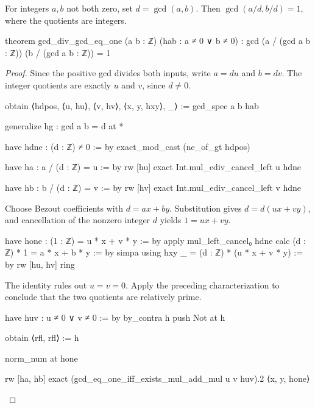 \begin{corollary}
  \label{ent:thm:gcd-div-gcd}
  For integers $a,b$ not both zero, set $d=\gcd(a,b)$.
  Then $\gcd(a/d,b/d)=1$, where the quotients are integers.

  \begin{lean}
    theorem gcd_div_gcd_eq_one (a b : ℤ) (hab : a ≠ 0 ∨ b ≠ 0) :
        gcd (a / (gcd a b : ℤ)) (b / (gcd a b : ℤ)) = 1
  \end{lean}
\end{corollary}

\begin{proof}
  Since the positive gcd divides both inputs, write $a=du$ and $b=dv$.
  The integer quotients are exactly $u$ and $v$, since $d\ne0$.

  \begin{lean}
    obtain ⟨hdpos, ⟨u, hu⟩, ⟨v, hv⟩, ⟨x, y, hxy⟩, _⟩ := gcd_spec a b hab

    generalize hg : gcd a b = d at *

    have hdne : (d : ℤ) ≠ 0 := by
      exact_mod_cast (ne_of_gt hdpos)

    have ha : a / (d : ℤ) = u := by
      rw [hu]
      exact Int.mul_ediv_cancel_left u hdne

    have hb : b / (d : ℤ) = v := by
      rw [hv]
      exact Int.mul_ediv_cancel_left v hdne
  \end{lean}
  Choose Bezout coefficients with $d=ax+by$.
  Substitution gives $d=d(ux+vy)$, and cancellation of the nonzero integer $d$ yields $1=ux+vy$.

  \begin{lean}
    have hone : (1 : ℤ) = u * x + v * y := by
      apply mul_left_cancel₀ hdne
      calc
        (d : ℤ) * 1 = a * x + b * y := by
          simpa using hxy
        _ = (d : ℤ) * (u * x + v * y) := by
          rw [hu, hv]
          ring
  \end{lean}
  The identity rules out $u=v=0$.
  Apply the preceding characterization to conclude that the two quotients are relatively prime.

  \begin{lean}
    have huv : u ≠ 0 ∨ v ≠ 0 := by
      by_contra h
      push Not at h

      obtain ⟨rfl, rfl⟩ := h

      norm_num at hone

    rw [ha, hb]
    exact (gcd_eq_one_iff_exists_mul_add_mul u v huv).2 ⟨x, y, hone⟩
  \end{lean}
\end{proof}

